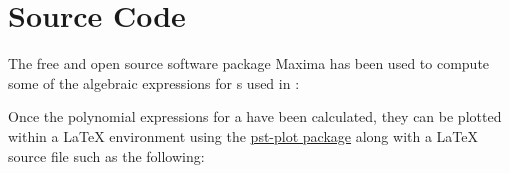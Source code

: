 
\chapter{Source Code}
\label{app:src_code}
\label{app:sourcecode}
%
%
%
%
%
%
%

The free and open source software package Maxima 
has been used to compute some of the algebraic expressions for s 
used in :
\\


\begin{minipage}{\tw-65mm}
Once the polynomial expressions for a  have been calculated, 
they can be plotted within a {\LaTeX} environment using the 
\href{http://www.ctan.org/pkg/pst-plot}{pst-plot package}
along with a {\LaTeX} source file such as the following:\footnotemark
\end{minipage}\hfill{}%
\\


